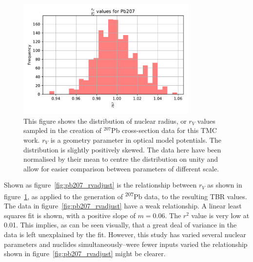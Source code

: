 \begin{figure}[H]
  \centering
	\includegraphics[width=0.8\textwidth]{rvadjust_param_Pb207_histogram}
	\caption[$r_{V}$ nuclear parameter distribution for $^{207}$Pb.]{This figure shows the distribution of nuclear radius, or $r_{V}$ values sampled in the creation of $^{207}$Pb cross-section data for this TMC work. $r_{V}$ is a geometry parameter in optical model potentials. The distribution is slightly positively skewed. The data here have been normalised by their mean to centre the distribution on unity and allow for easier comparison between parameters of different scale.}
	\label{fig:pb207_rvadjust_hist}
\end{figure}

Shown as figure~\ref{fig:pb207_rvadjust} is the relationship between $r_{V}$ as shown in figure~\ref{fig:pb207_rvadjust_hist}, as applied to the generation of \textsuperscript{207}Pb data, to the resulting TBR values. The data in figure~\ref{fig:pb207_rvadjust} have a weak relationship. A linear least squares fit is shown, with a positive slope of $m=0.06$. The $r^{2}$ value is very low at 0.01. This implies, as can be seen visually, that a great deal of variance in the data is left unexplained by the fit. However, this study has varied several nuclear parameters and nuclides simultaneously--were fewer inputs varied the relationship shown in figure~\ref{fig:pb207_rvadjust} might be clearer. 

